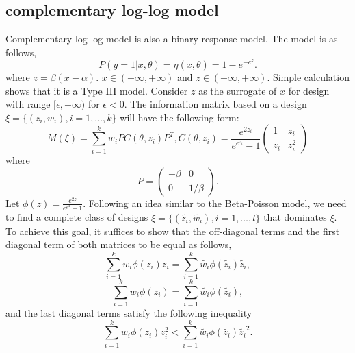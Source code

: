 \documentclass[11pt]{amsart}
\theoremstyle{definition}
\theoremstyle{remark}
\begin{document}
\subsection{complementary log-log model } 

Complementary log-log model is also a binary response model. The model is as follows,\[
P(y=1|x,\theta) = \eta(x,\theta)= 1-e^{-e^z}.
\]where $z = \beta(x-\alpha)$. $x\in (-\infty,+\infty)$ and $z\in (-\infty,+\infty)$. Simple calculation shows that it is a Type III model. Consider $z$ as the surrogate of $x$ for design with range $[\epsilon, +\infty)$ for $\epsilon <0$. The information matrix based on a design $\xi = \{(z_i,w_i), i=1,\ldots,k\}$ will have the following form: \begin{equation}
M(\xi) = \sum_{i=1}^{k} w_i PC(\theta,z_i) P^T, C(\theta,z_i) = \frac{e^{2z_i}}{e^{e^{z_i}}-1}\left( \begin{array}{cc}
1 & z_i\\
z_i & z_i^2
\end{array} \right)
\end{equation} where \[P = \left( \begin{array}{cc}
-\beta & 0\\
0 & 1/\beta
\end{array} \right).\] 
Let $\phi(z) =  \frac{e^{2z}}{e^{e^z}-1}$. Following an idea similar to the Beta-Poisson model, we need to find a complete class of designs $\tilde{\xi} = \{(\tilde{z_i},\tilde{w_i}), i=1,\ldots,l\}$ that dominates $\xi$. To achieve this goal, it suffices to show that the off-diagonal terms and the first diagonal term of both matrices to be equal as follows,
\begin{equation}
\sum_{i=1}^{k} w_i \phi(z_i)z_i = \sum_{i=1}^{k} \tilde{w_i}  \phi(\tilde{z_i}) \tilde{z_i},\end{equation}  \begin{equation}
\sum_{i=1}^{k} w_i  \phi(z_i)= \sum_{i=1}^{k} \tilde{w_i} \phi(\tilde{z_i}),\end{equation}
and the last diagonal terms satisfy the following inequality \begin{equation}
\sum_{i=1}^{k} w_i \phi(z_i)z_i^2 < \sum_{i=1}^{k} \tilde{w_i}\phi(\tilde{z_i})\tilde{z_i}^2.
\end{equation}
\end{document}
